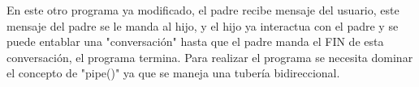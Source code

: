 	En este otro programa ya modificado, el padre recibe mensaje del usuario, este mensaje del padre se le manda al hijo, y el hijo ya interactua con el padre y se puede entablar una "conversación" hasta que el padre manda el FIN de esta conversación, el programa termina. Para realizar el programa se necesita dominar el concepto de "pipe()" ya que se maneja una tubería bidireccional.